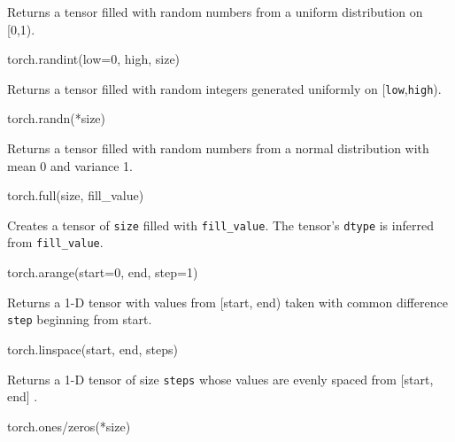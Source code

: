 \documentclass[
]{article}
\newenvironment{Shaded}{}{}
\newcommand{\DecValTok}[1]{\textcolor[rgb]{0.25,0.63,0.44}{#1}}
\newcommand{\NormalTok}[1]{#1}
\newcommand{\OperatorTok}[1]{\textcolor[rgb]{0.40,0.40,0.40}{#1}}
\begin{document}
Returns a tensor filled with random numbers from a uniform distribution
on {[}0,1).

\begin{Shaded}
\begin{Highlighting}[]
\NormalTok{torch.randint(low}\OperatorTok{=}\DecValTok{0}\NormalTok{, high, size)}
\end{Highlighting}
\end{Shaded}

Returns a tensor filled with random integers generated uniformly on
{[}\texttt{low},\texttt{high}).

\begin{Shaded}
\begin{Highlighting}[]
\NormalTok{torch.randn(}\OperatorTok{*}\NormalTok{size)}
\end{Highlighting}
\end{Shaded}

Returns a tensor filled with random numbers from a normal distribution
with mean 0 and variance 1.

\begin{Shaded}
\begin{Highlighting}[]
\NormalTok{torch.full(size, fill\_value)}
\end{Highlighting}
\end{Shaded}

Creates a tensor of \texttt{size} filled with \texttt{fill\_value}. The
tensor's \texttt{dtype} is inferred from \texttt{fill\_value}.

\begin{Shaded}
\begin{Highlighting}[]
\NormalTok{torch.arange(start}\OperatorTok{=}\DecValTok{0}\NormalTok{, end, step}\OperatorTok{=}\DecValTok{1}\NormalTok{)}
\end{Highlighting}
\end{Shaded}

Returns a 1-D tensor with values from {[}start, end) taken with common
difference \texttt{step} beginning from start.

\begin{Shaded}
\begin{Highlighting}[]
\NormalTok{torch.linspace(start, end, steps)}
\end{Highlighting}
\end{Shaded}

Returns a 1-D tensor of size \texttt{steps} whose values are evenly
spaced from {[}start, end{]} .

\begin{Shaded}
\begin{Highlighting}[]
\NormalTok{torch.ones}\OperatorTok{/}\NormalTok{zeros(}\OperatorTok{*}\NormalTok{size)}
\end{Highlighting}
\end{Shaded}
\end{document}
